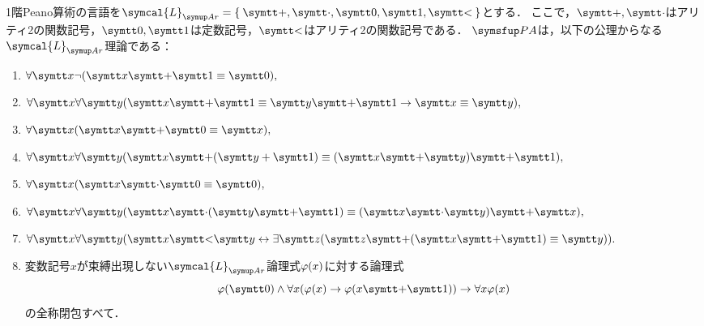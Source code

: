 \begin{Def} \label{Def:peanoarithmetic}
	1階Peano算術の言語を\(\symcal{L}_{\Ar} = \Set{\obj{+}, \obj{\cdot}, \obj{0}, \obj{1}, \obj{<}}\)とする．
	ここで，\(\obj{+}, \obj{\cdot}\)はアリティ2の関数記号，\(\obj{0}, \obj{1}\)は定数記号，\(\obj{<}\)はアリティ2の関数記号である．
	\(\PA\)は，以下の公理からなる\(\symcal{L}_{\Ar}\)理論である：
	\begin{enumerate}[label=A\arabic*.,ref=A\arabic*]
		\item \label{item:PAA1} \(\forall \obj{x} \lnot \paren{\obj{x} \obj{+} \obj{1} \objeq \obj{0}},\)
		\item \label{item:PAA2} \(\forall \obj{x} \forall \obj{y} \paren{\obj{x} \obj{+} \obj{1} \objeq \obj{y} \obj{+} \obj{1} \to \obj{x} \objeq \obj{y}},\)
		\item \label{item:PAA3} \(\forall \obj{x} \paren{\obj{x} \obj{+} \obj{0} \objeq \obj{x}},\)
		\item \label{item:PAA4} \(\forall \obj{x} \forall \obj{y} \paren{\obj{x} \obj{+} \paren{\obj{y} + \obj{1}} \objeq \paren{\obj{x} \obj{+} \obj{y}} \obj{+} \obj{1}},\)
		\item \label{item:PAA5} \(\forall \obj{x} \paren{\obj{x} \obj{\cdot} \obj{0} \objeq \obj{0}},\)
		\item \label{item:PAA6} \(\forall \obj{x} \forall \obj{y} \paren{\obj{x} \obj{\cdot} \paren{\obj{y} \obj{+} \obj{1}} \objeq \paren{\obj{x} \obj{\cdot} \obj{y}} \obj{+} \obj{x}},\)
		\item \label{item:PAA7} \(\forall \obj{x} \forall \obj{y} \paren{\obj{x} \obj{<} \obj{y} \formulaequiv \exists \obj{z} \paren{\obj{z} \obj{+} \paren{\obj{x} \obj{+} \obj{1}}\objeq \obj{y}}}.\)
		\item \label{item:PAA8} 変数記号\(x\)が束縛出現しない\(\symcal{L}_{\Ar}\)論理式\(\apply{\varphi}{x}\)に対する論理式
		      \begin{equation}
			      \apply{\varphi}{\obj{0}} \land \forall x \paren{\apply{\varphi}{x} \to \apply{\varphi}{x \obj{+} \obj{1}}} \to \forall x \apply{\varphi}{x}
			      \label{eq:inductionscheme}
		      \end{equation}
		      の全称閉包すべて．
	\end{enumerate}
\end{Def}


